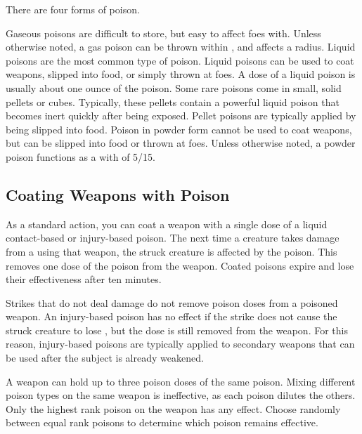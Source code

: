         There are four forms of poison.

         Gaseous poisons are difficult to store, but easy to affect foes with.
        Unless otherwise noted, a gas poison can be thrown within \shortrange, and affects a \tinyarea radius.
         Liquid poisons are the most common type of poison.
        Liquid poisons can be used to coat weapons, slipped into food, or simply thrown at foes.
        A dose of a liquid poison is usually about one ounce of the poison.
         Some rare poisons come in small, solid pellets or cubes.
        Typically, these pellets contain a powerful liquid poison that becomes inert quickly after being exposed.
        Pellet poisons are typically applied by being slipped into food.
         Poison in powder form cannot be used to coat weapons, but can be slipped into food or thrown at foes.
        Unless otherwise noted, a powder poison functions as a  with  of 5/15.

    \subsection{Coating Weapons with Poison}\label{Coating Weapons with Poison}
        As a standard action, you can coat a weapon with a single dose of a liquid contact-based or injury-based poison.
        The next time a creature takes damage from a  using that weapon, the struck creature is affected by the poison.
        This removes one dose of the poison from the weapon.
        Coated poisons expire and lose their effectiveness after ten minutes.

        Strikes that do not deal damage do not remove poison doses from a poisoned weapon.
        An injury-based poison has no effect if the strike does not cause the struck creature to lose , but the dose is still removed from the weapon.
        For this reason, injury-based poisons are typically applied to secondary weapons that can be used after the subject is already weakened.

        A weapon can hold up to three poison doses of the same poison.
        Mixing different poison types on the same weapon is ineffective, as each poison dilutes the others.
        Only the highest rank poison on the weapon has any effect.
        Choose randomly between equal rank poisons to determine which poison remains effective.

